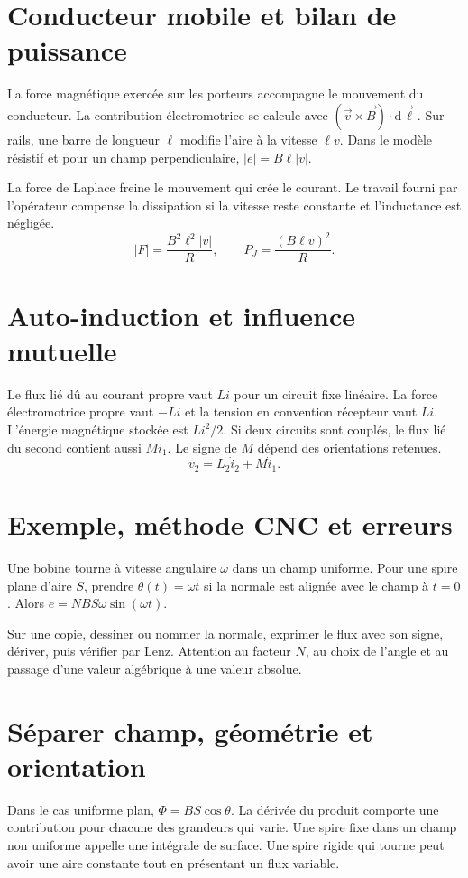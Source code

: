 \documentclass[11pt,a4paper]{article}
\begin{document}
\section*{Conducteur mobile et bilan de puissance}
La force magnétique exercée sur les porteurs accompagne le mouvement du conducteur. La contribution électromotrice se calcule avec $(\vec v\times\vec B)\cdot\mathrm d\vec\ell$. Sur rails, une barre de longueur $\ell$ modifie l’aire à la vitesse $\ell v$. Dans le modèle résistif et pour un champ perpendiculaire, $|e|=B\ell |v|$.

La force de Laplace freine le mouvement qui crée le courant. Le travail fourni par l’opérateur compense la dissipation si la vitesse reste constante et l’inductance est négligée.
\[ |F|=\frac{B^2\ell^2|v|}R,\qquad P_J=\frac{(B\ell v)^2}R. \]

\section*{Auto-induction et influence mutuelle}
Le flux lié dû au courant propre vaut $Li$ pour un circuit fixe linéaire. La force électromotrice propre vaut $-L\dot i$ et la tension en convention récepteur vaut $L\dot i$. L’énergie magnétique stockée est $Li^2/2$. Si deux circuits sont couplés, le flux lié du second contient aussi $Mi_1$. Le signe de $M$ dépend des orientations retenues.
\[ v_2=L_2\dot i_2+M\dot i_1. \]

\section*{Exemple, méthode CNC et erreurs}
Une bobine tourne à vitesse angulaire $\omega$ dans un champ uniforme. Pour une spire plane d’aire $S$, prendre $\theta(t)=\omega t$ si la normale est alignée avec le champ à $t=0$. Alors $e=NBS\omega\sin(\omega t)$.

Sur une copie, dessiner ou nommer la normale, exprimer le flux avec son signe, dériver, puis vérifier par Lenz. Attention au facteur $N$, au choix de l’angle et au passage d’une valeur algébrique à une valeur absolue.

\section*{Séparer champ, géométrie et orientation}
Dans le cas uniforme plan, $\Phi=BS\cos\theta$. La dérivée du produit comporte une contribution pour chacune des grandeurs qui varie. Une spire fixe dans un champ non uniforme appelle une intégrale de surface. Une spire rigide qui tourne peut avoir une aire constante tout en présentant un flux variable.
\end{document}
